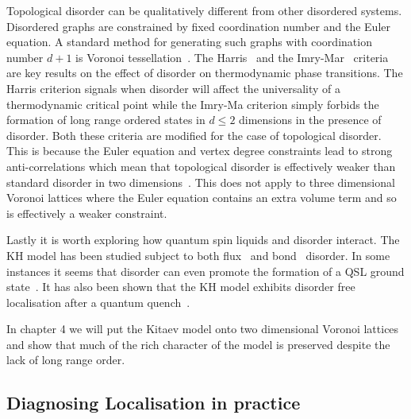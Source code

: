 Topological disorder can be qualitatively different from other disordered systems. Disordered graphs are constrained by fixed coordination number and the Euler equation. A standard method for generating such graphs with coordination number \(d+1\) is Voronoi tessellation~\autocite{mitchellAmorphousTopologicalInsulators2018,marsalTopologicalWeaireThorpeModels2020}. The Harris~\autocite{harrisEffectRandomDefects1974} and the Imry-Mar~\autocite{imryRandomFieldInstabilityOrdered1975} criteria are key results on the effect of disorder on thermodynamic phase transitions. The Harris criterion signals when disorder will affect the universality of a thermodynamic critical point while the Imry-Ma criterion simply forbids the formation of long range ordered states in \(d \leq 2\) dimensions in the presence of disorder. Both these criteria are modified for the case of topological disorder. This is because the Euler equation and vertex degree constraints lead to strong anti-correlations which mean that topological disorder is effectively weaker than standard disorder in two dimensions~\autocite{barghathiPhaseTransitionsRandom2014,schrauthViolationHarrisBarghathiVojtaCriterion2018}. This does not apply to three dimensional Voronoi lattices where the Euler equation contains an extra volume term and so is effectively a weaker constraint.

Lastly it is worth exploring how quantum spin liquids and disorder interact. The KH model has been studied subject to both flux~\autocite{Nasu_Thermal_2015} and bond~\autocite{knolle_dynamics_2016} disorder. In some instances it seems that disorder can even promote the formation of a QSL ground state~\autocite{wenDisorderedRouteCoulomb2017}. It has also been shown that the KH model exhibits disorder free localisation after a quantum quench~\autocite{zhuSubdiffusiveDynamicsCritical2021}.

In chapter 4 we will put the Kitaev model onto two dimensional Voronoi lattices and show that much of the rich character of the model is preserved despite the lack of long range order.

\hypertarget{diagnosing-localisation-in-practice}{%
\subsection{Diagnosing Localisation in practice}\label{diagnosing-localisation-in-practice}}

